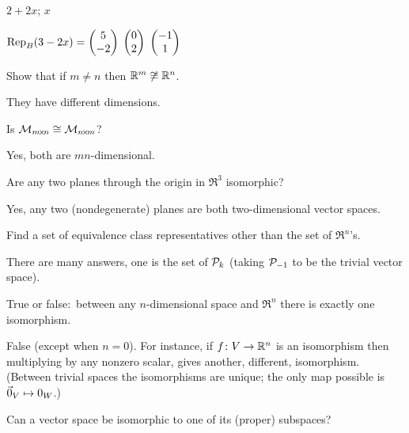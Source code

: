 \begin{exercises}
\begin{exparts*}
      \partsitem \( 2+2x \);
      \partsitem \( x \)
    \end{exparts*}
    \begin{answer}
      \begin{exparts*}
        \partsitem \( \rep{3-2x}{B}=\colvec{5 \\ -2} \)
        \partsitem \( \colvec{0 \\ 2} \)
        \partsitem \( \colvec{-1 \\ 1} \)
      \end{exparts*}  
     \end{answer}
  \recommended \item
    Show that if \( m\neq n \) then \( \Re^m\not\isomorphicto\Re^n \).
     \begin{answer}
       They have different dimensions.  
     \end{answer}
  \recommended \item
    Is \( \matspace_{\nbym{m}{n}}\isomorphicto\matspace_{\nbym{n}{m}} \)?
    \begin{answer}
      Yes, both are \( mn \)-dimensional.  
    \end{answer}
  \recommended \item
    Are any two planes through the origin in \( \Re^3 \) isomorphic?
    \begin{answer}
      Yes, any two (nondegenerate) planes are both two-dimensional 
      vector spaces.
    \end{answer}
  \item 
     Find a set of equivalence class representatives other than the
     set of \( \Re^n \)'s.
     \begin{answer}
        There are many answers, one is the set of \( \polyspace_k \)
        (taking \( \polyspace_{-1} \) to be the trivial vector space).  
     \end{answer}
  \item 
    True or false:~between any \( n \)-dimensional space and \( \Re^n \)
    there is exactly one isomorphism.
    \begin{answer}
      False  (except when \( n=0 \)).
      For instance,
      if \( \map{f}{V}{\Re^n} \) is an isomorphism then multiplying by any
      nonzero scalar, gives another, different, isomorphism.
      (Between trivial spaces the isomorphisms are unique; the only map
      possible is $\zero_V\mapsto 0_W$.)  
    \end{answer}
  \item 
    Can a vector space be isomorphic to one of its (proper) subspaces?

\end{exercises}
